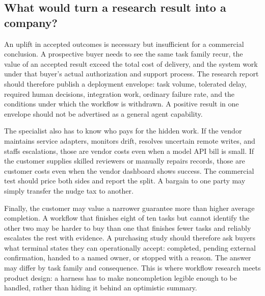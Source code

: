 \subsection*{What would turn a research result into a company?}

An uplift in accepted outcomes is necessary but insufficient for a commercial conclusion. A prospective buyer needs to see the same task family recur, the value of an accepted result exceed the total cost of delivery, and the system work under that buyer's actual authorization and support process. The research report should therefore publish a deployment envelope: task volume, tolerated delay, required human decisions, integration work, ordinary failure rate, and the conditions under which the workflow is withdrawn. A positive result in one envelope should not be advertised as a general agent capability.

The specialist also has to know who pays for the hidden work. If the vendor maintains service adapters, monitors drift, resolves uncertain remote writes, and staffs escalations, those are vendor costs even when a model API bill is small. If the customer supplies skilled reviewers or manually repairs records, those are customer costs even when the vendor dashboard shows success. The commercial test should price both sides and report the split. A bargain to one party may simply transfer the nudge tax to another.

Finally, the customer may value a narrower guarantee more than higher average completion. A workflow that finishes eight of ten tasks but cannot identify the other two may be harder to buy than one that finishes fewer tasks and reliably escalates the rest with evidence. A purchasing study should therefore ask buyers what terminal states they can operationally accept: completed, pending external confirmation, handed to a named owner, or stopped with a reason. The answer may differ by task family and consequence. This is where workflow research meets product design: a harness has to make noncompletion legible enough to be handled, rather than hiding it behind an optimistic summary.
